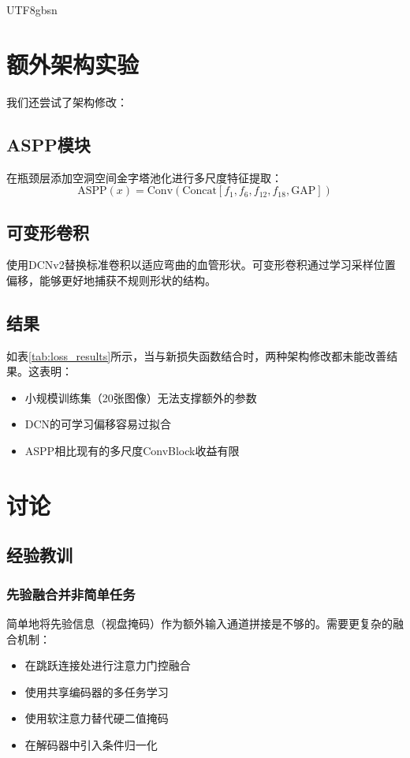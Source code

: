 \documentclass[conference]{IEEEtran}
\begin{document}
\begin{CJK}{UTF8}{gbsn}
\section{额外架构实验}

我们还尝试了架构修改：

\subsection{ASPP模块}
在瓶颈层添加空洞空间金字塔池化\cite{chen2017deeplab}进行多尺度特征提取：
\begin{equation}
    \text{ASPP}(x) = \text{Conv}(\text{Concat}[f_1, f_6, f_{12}, f_{18}, \text{GAP}])
\end{equation}

\subsection{可变形卷积}
使用DCNv2\cite{dai2017deformable}替换标准卷积以适应弯曲的血管形状。可变形卷积通过学习采样位置偏移，能够更好地捕获不规则形状的结构。

\subsection{结果}
如表\ref{tab:loss_results}所示，当与新损失函数结合时，两种架构修改都未能改善结果。这表明：
\begin{itemize}
    \item 小规模训练集（20张图像）无法支撑额外的参数
    \item DCN的可学习偏移容易过拟合
    \item ASPP相比现有的多尺度ConvBlock收益有限
\end{itemize}

\section{讨论}

\subsection{经验教训}

\subsubsection{先验融合并非简单任务}
简单地将先验信息（视盘掩码）作为额外输入通道拼接是不够的。需要更复杂的融合机制：
\begin{itemize}
    \item 在跳跃连接处进行注意力门控融合
    \item 使用共享编码器的多任务学习
    \item 使用软注意力替代硬二值掩码
    \item 在解码器中引入条件归一化
\end{itemize}


\end{CJK}
\end{document}
